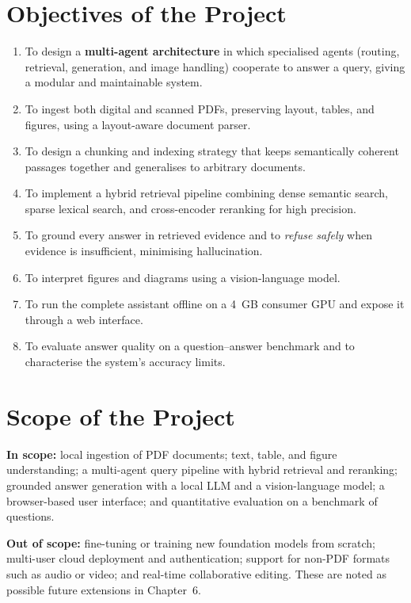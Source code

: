 \documentclass[12pt,a4paper]{report}
\begin{document}
\section{Objectives of the Project}
\begin{enumerate}[leftmargin=1.6em]
  \item To design a \textbf{multi-agent architecture} in which specialised agents
        (routing, retrieval, generation, and image handling) cooperate to answer a
        query, giving a modular and maintainable system.
  \item To ingest both digital and scanned PDFs, preserving layout, tables, and
        figures, using a layout-aware document parser.
  \item To design a chunking and indexing strategy that keeps semantically
        coherent passages together and generalises to arbitrary documents.
  \item To implement a hybrid retrieval pipeline combining dense semantic search,
        sparse lexical search, and cross-encoder reranking for high precision.
  \item To ground every answer in retrieved evidence and to \emph{refuse safely}
        when evidence is insufficient, minimising hallucination.
  \item To interpret figures and diagrams using a vision-language model.
  \item To run the complete assistant offline on a 4~GB consumer GPU and expose it
        through a web interface.
  \item To evaluate answer quality on a question--answer benchmark and to
        characterise the system's accuracy limits.
\end{enumerate}

\section{Scope of the Project}
\textbf{In scope:} local ingestion of PDF documents; text, table, and figure
understanding; a multi-agent query pipeline with hybrid retrieval and reranking;
grounded answer generation with a local LLM and a vision-language model; a
browser-based user interface; and quantitative evaluation on a benchmark of
questions.

\textbf{Out of scope:} fine-tuning or training new foundation models from scratch;
multi-user cloud deployment and authentication; support for non-PDF formats such
as audio or video; and real-time collaborative editing. These are noted as
possible future extensions in Chapter~6.
\end{document}
